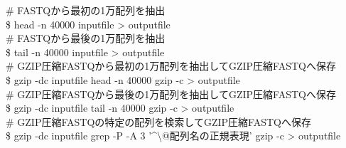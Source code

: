 \documentclass[titlepage,10pt,a4paper,english]{jsbook}
\newenvironment{cmd}{\begin{oframed}\raggedright\ttfamily\footnotesize\setlength{\baselineskip}{1.4em}}{\end{oframed}\vspace{-1em}}
\begin{document}
\begin{cmd}
\# FASTQから最初の1万配列を抽出\\
\$ head -n 40000 inputfile {\textgreater} outputfile\\
\# FASTQから最後の1万配列を抽出\\
\$ tail -n 40000 inputfile {\textgreater} outputfile\\
\# GZIP圧縮FASTQから最初の1万配列を抽出してGZIP圧縮FASTQへ保存\\
\$ gzip -dc inputfile {\textbar} head -n 40000 {\textbar} gzip -c {\textgreater} outputfile\\
\# GZIP圧縮FASTQから最後の1万配列を抽出してGZIP圧縮FASTQへ保存\\
\$ gzip -dc inputfile {\textbar} tail -n 40000 {\textbar} gzip -c {\textgreater} outputfile\\
\# GZIP圧縮FASTQの特定の配列を検索してGZIP圧縮FASTQへ保存\\
\$ gzip -dc inputfile {\textbar} grep -P -A 3 '{\textasciicircum}{\textbackslash}@配列名の正規表現' {\textbar} gzip -c {\textgreater} outputfile
\end{cmd}
\end{document}
